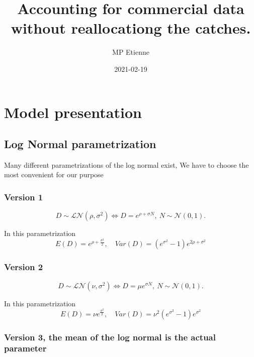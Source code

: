 \documentclass[
]{book}
\title{Accounting for commercial data without reallocationg the catches.}
\author{MP Etienne}
\date{2021-02-19}
\begin{document}
\maketitle

{
\setcounter{tocdepth}{1}
\tableofcontents
}
\hypertarget{model-presentation}{%
\chapter{Model presentation}\label{model-presentation}}

\hypertarget{log-normal-parametrization}{%
\section{Log Normal parametrization}\label{log-normal-parametrization}}

Many different parametrizations of the log normal exist, We have to choose the most convenient for our purpose

\hypertarget{version-1}{%
\subsection{Version 1}\label{version-1}}

\begin{equation} 
  D \sim \mathcal{LN} (\rho, \sigma^2) \Longleftrightarrow D =e^{\rho + \sigma N}, \ N\sim \mathcal{N}(0,1) .
  \label{eq:LNv1}
\end{equation}

In this parametrization
\[E(D) = e^{\rho +\frac{\sigma^2}{2}},\quad Var(D) = \left(e^{\sigma^2}-1\right) e^{2\rho + \sigma^2}\]

\hypertarget{version-2}{%
\subsection{Version 2}\label{version-2}}

\begin{equation} 
  D \sim \mathcal{LN} (\nu, \sigma^2) \Longleftrightarrow D =\mu e^{\sigma N}, \ N\sim \mathcal{N}(0,1) .
  \label{eq:LNv2}
\end{equation}

In this parametrization
\[E(D) = \nu e^{\frac{\sigma^2}{2}},\quad Var(D) = \nu^2 \left(e^{\sigma^2}-1\right) e^{ \sigma^2}\]

\hypertarget{version-3-the-mean-of-the-log-normal-is-the-actual-parameter}{%
\subsection{Version 3, the mean of the log normal is the actual parameter}\label{version-3-the-mean-of-the-log-normal-is-the-actual-parameter}}
\end{document}
